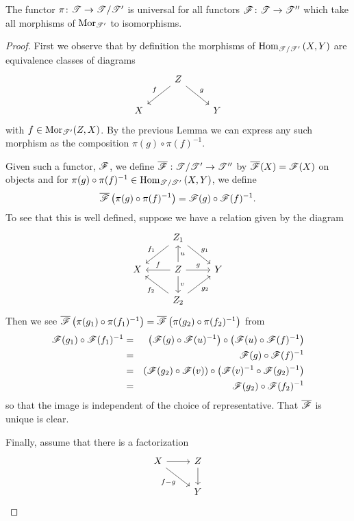 \documentclass[dissertation.tex]{subfiles}
\begin{document}
\begin{prop}\label{VerdierLocalizationUniversal}
  The functor $\pi \colon \mathscr{T} \to \mathscr{T}/\mathscr{T}^\prime$ is universal for all functors $\mathscr{F} \colon \mathscr{T} \rightarrow \mathscr{T}^{\prime\prime}$ which take all morphisms of $\operatorname{Mor}_{\mathscr{T}^\prime}$ to isomorphisms.
  
  \begin{proof}
    First we observe that by definition the morphisms of $\operatorname{Hom}_{\mathscr{T}/\mathscr{T}^\prime}\left(X,Y\right)$ are equivalence classes of diagrams
    $$\begin{tikzcd}
      & Z \arrow[swap]{ld}{f} \arrow{rd}{g}\\
      X & & Y
    \end{tikzcd}$$
    with $f \in \operatorname{Mor}_{\mathscr{T}^\prime}(Z,X)$.
    By the previous Lemma we can express any such morphism as the composition
    $\pi(g) \circ \pi(f)^{-1}$.
    
    Given such a functor, $\mathscr{F}$, we define $\overline{\mathscr{F}}: \mathscr{T}/\mathscr{T}^\prime \rightarrow \mathscr{T}^{\prime\prime}$ by $\overline{\mathscr{F}}(X) = \mathscr{F}(X)$ on objects and for $\pi(g) \circ \pi(f)^{-1} \in \operatorname{Hom}_{\mathscr{T}/\mathscr{T}^\prime}\left(X,Y\right)$, we define
    $$\overline{\mathscr{F}}\left(\pi(g) \circ \pi(f)^{-1}\right) = \mathscr{F}(g) \circ \mathscr{F}(f)^{-1}.$$
    To see that this is well defined, suppose we have a relation given by the diagram
    $$\begin{tikzcd}
      & Z_1 \arrow[swap]{ld}{f_1}\arrow{rd}{g_1}\\
      X & Z \arrow[swap]{l}{f} \arrow[swap]{u}{u} \arrow{d}{v} \arrow{r}{g} & Y\\
      & Z_2 \arrow{ul}{f_2} \arrow[swap]{ur}{g_2}
    \end{tikzcd}$$
    Then we see $\overline{\mathscr{F}}\left(\pi(g_1) \circ \pi(f_1)^{-1}\right) = \overline{\mathscr{F}}\left(\pi(g_2)\circ\pi(f_2)^{-1}\right)$ from
    \begin{eqnarray*}
      \mathscr{F}(g_1)\circ\mathscr{F}(f_1)^{-1} 
      &=& \left(\mathscr{F}(g)\circ\mathscr{F}(u)^{-1}\right)\circ\left(\mathscr{F}(u)\circ\mathscr{F}(f)^{-1}\right)\\
      &=& \mathscr{F}(g)\circ\mathscr{F}(f)^{-1}\\
      &=& \left(\mathscr{F}(g_2)\circ\mathscr{F}(v)\right)\circ\left(\mathscr{F}(v)^{-1}\circ\mathscr{F}(g_2)^{-1}\right)\\
      &=& \mathscr{F}(g_2) \circ \mathscr{F}(f_2)^{-1}
    \end{eqnarray*}
    so that the image is independent of the choice of representative.
    That $\overline{\mathscr{F}}$ is unique is clear.

    Finally, assume that there is a factorization
    $$\begin{tikzcd}
      X \arrow{r}\arrow[swap]{rd}{f - g} & Z\arrow{d}\\
      & Y
    \end{tikzcd}$$
  \end{proof}
\end{prop}
\end{document}
